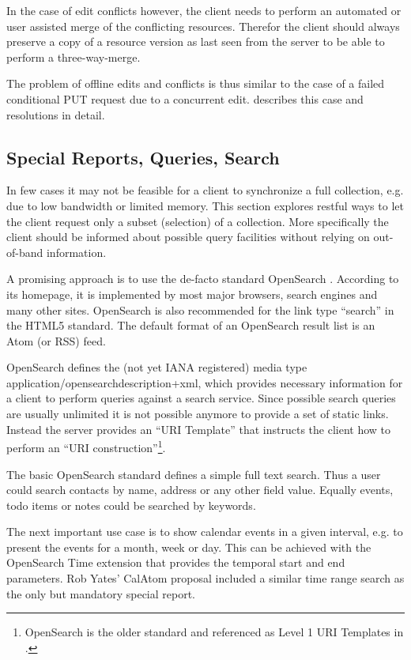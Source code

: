 \documentclass[11pt,a4paper,headsepline,twoside]{scrartcl}		%
\begin{document}
In the case of edit conflicts however, the client needs to perform an automated
or user assisted merge of the conflicting resources. Therefor the client should
always preserve a copy of a resource version as last seen from the server to be
able to perform a three-way-merge.

The problem of offline edits and conflicts is thus similar to the case of a
failed conditional PUT request due to a concurrent edit. \cite{Nielsen1999}
describes this case and resolutions in detail.


\subsection{Special Reports, Queries, Search}
\label{sec:spec-reports-search}

In few cases it may not be feasible for a client to synchronize a full
collection, e.g. due to low bandwidth or limited memory. This section explores
restful ways to let the client request only a subset (selection) of a
collection. More specifically the client should be informed about possible query
facilities without relying on out-of-band information.

A promising approach is to use the de-facto standard
OpenSearch \cite{Clinton}. According to its homepage, it is implemented by most
major browsers, search engines and many other sites. OpenSearch is also
recommended for the link type ``search'' in the HTML5
standard\cite[sec. 4.12.4.12]{Hickson2011a}. The default format of an OpenSearch
result list is an Atom (or RSS) feed.

OpenSearch defines the (not yet IANA registered) media type
application/opensearchdescription+xml, which provides necessary information for
a client to perform queries against a search service. Since possible search
queries are usually unlimited it is not possible anymore to provide a set of
static links. Instead the server provides an ``URI Template'' \cite{RFC6570}
that instructs the client how to perform an ``URI
construction''\footnote{OpenSearch is the older standard and referenced as Level
  1 URI Templates in \cite{RFC6570}.}.

The basic OpenSearch standard defines a simple full text search. Thus a user
could search contacts by name, address or any other field value. Equally events,
todo items or notes could be searched by keywords.

The next important use case is to show calendar events in a given interval,
e.g. to present the events for a month, week or day. This can be achieved with
the OpenSearch Time extension that provides the temporal start and end
parameters. Rob Yates' CalAtom \cite{draft-yates-atompub-calatom-00.txt} proposal
included a similar time range search as the only but mandatory special report.
\end{document}
